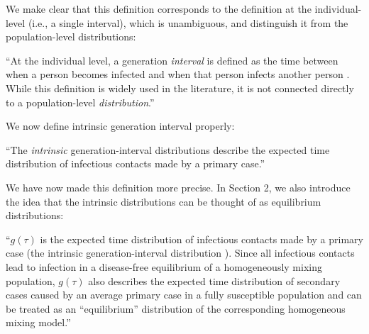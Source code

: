 We make clear that this definition corresponds to the definition at the individual-level (i.e., a single interval), which is unambiguous, and distinguish it from the population-level distributions:

``At the individual level, a generation \emph{interval} is defined as the time between when a person becomes infected and when that person infects another person \citep{svensson2007note}.
While this definition is widely used in the literature, it is not connected directly to a population-level \emph{distribution}.''


We now define intrinsic generation interval properly:

``The \emph{intrinsic} generation-interval distributions describe the expected time distribution of infectious contacts made by a primary case.''


We have now made this definition more precise. In Section 2, we also introduce the idea that the intrinsic distributions can be thought of as equilibrium distributions:

``$g(\tau)$ is the expected time distribution of infectious contacts made by a primary case (the intrinsic generation-interval distribution \citep{champredon2015intrinsic}).
Since all infectious contacts lead to infection in a disease-free equilibrium of a homogeneously mixing population, $g(\tau)$ also describes the expected time distribution of secondary cases caused by an average primary case in a fully susceptible population and can be treated as an ``equilibrium'' distribution of the corresponding homogeneous mixing model.''



